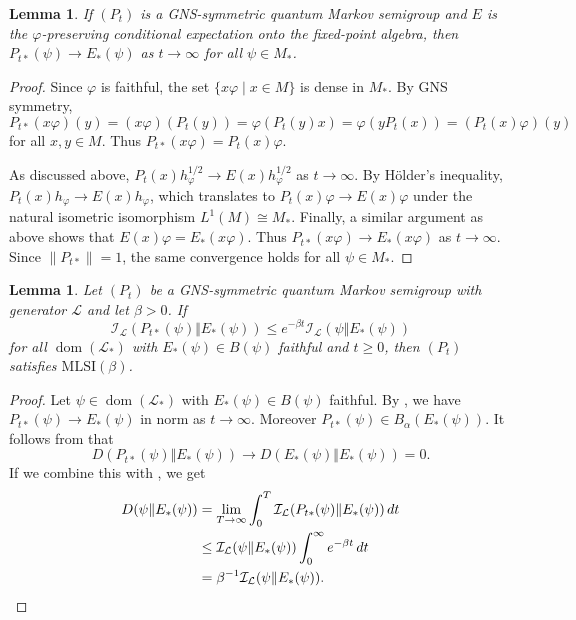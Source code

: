 \documentclass[12pt,a4paper]{amsart}
\newcommand{\1}{\mathds{1}}
\renewcommand{\phi}{\varphi}
\newcommand{\I}{\mathcal I}
\renewcommand{\L}{\mathcal L}
\newcommand{\dom}{\operatorname{dom}}
\newcommand{\norm}[1]{\lVert#1\rVert}
\theoremstyle{plain}
\newtheorem{lemma}[proposition]{Lemma}
\theoremstyle{definition}
\theoremstyle{remark}
\begin{document}
\begin{lemma}\label{lem:long_time_GNS}
    If $(P_t)$ is a GNS-symmetric quantum Markov semigroup and $E$ is the $\phi$-preserving conditional expectation onto the fixed-point algebra, then $P_{t\ast}(\psi)\to E_\ast(\psi)$ as $t\to\infty$ for all $\psi\in M_\ast$.
\end{lemma}
\begin{proof}
    Since $\phi$ is faithful, the set $\{x\phi\mid x\in M\}$ is dense in $M_\ast$. By GNS symmetry,
    \begin{equation*}
        P_{t\ast}(x\phi)(y)=(x\phi)(P_t(y))=\phi(P_t(y)x)=\phi(yP_t(x))=(P_t(x)\phi)(y)
    \end{equation*}
    for all $x,y\in M$. Thus $P_{t\ast}(x\phi)=P_t(x)\phi$.

    As discussed above, $P_t(x)h_\phi^{1/2}\to E(x)h_\phi^{1/2}$ as $t\to\infty$. By Hölder's inequality, $P_t(x)h_\phi\to E(x)h_\phi$, which translates to $P_t(x)\phi\to E(x)\phi$ under the natural isometric isomorphism $L^1(M)\cong M_\ast$. Finally, a similar argument as above shows that $E(x)\phi=E_\ast(x\phi)$. Thus $P_{t\ast}(x\phi)\to E_\ast(x\phi)$ as $t\to\infty$. Since $\norm{P_{t\ast}}=1$, the same convergence holds for all $\psi\in M_\ast$.
\end{proof}

\begin{lemma}\label{lem:FM_implies_MLSI}
Let $(P_t)$ be a GNS-symmetric quantum Markov semigroup with generator $\L$ and let $\beta>0$. If
\begin{equation*}
\I_\L(P_{t\ast}(\psi)\Vert E_\ast(\psi))\leq e^{-\beta t}\I_\L(\psi\Vert E_\ast(\psi))
\end{equation*}
for all $\dom(\L_\ast)$ with $E_\ast(\psi)\in B(\psi)$ faithful and $t\geq 0$, then $(P_t)$ satisfies $\mathrm{MLSI}(\beta)$.
\end{lemma}
\begin{proof}
Let $\psi\in\dom(\L_\ast)$ with $E_\ast(\psi)\in B(\psi)$ faithful. By , we have $P_{t\ast}(\psi)\to E_\ast(\psi)$ in norm as $t\to\infty$. Moreover $P_{t\ast}(\psi)\in B_\alpha(E_\ast(\psi))$. It follows from \cite[Theorem 3.7]{Ara78} that 
\begin{equation*}
D(P_{t\ast}(\psi)\Vert E_\ast(\psi))\to D(E_\ast(\psi)\Vert E_\ast(\psi))=0.
\end{equation*}
If we combine this with , we get
\begin{align*}
D(\psi\Vert E_\ast(\psi))&=\lim_{T\to\infty}\int_0^T \I_\L(P_{t\ast}(\psi)\Vert E_\ast(\psi))\,dt\\
&\leq \I_\L(\psi\Vert E_\ast(\psi))\int_0^\infty e^{-\beta t}\,dt\\
&=\beta^{-1}\I_\L(\psi\Vert E_\ast(\psi)).\qedhere
\end{align*}
\end{proof}
\end{document}
